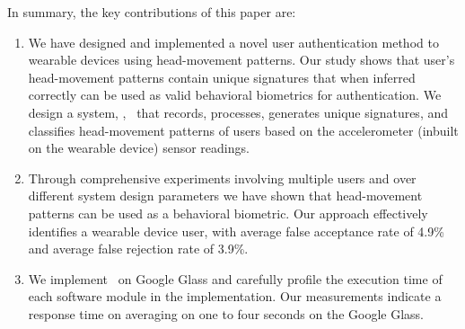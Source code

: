 
In summary, the key contributions of this paper are:

\begin{enumerate}

\item We have designed and implemented a novel user authentication method to wearable devices
using head-movement patterns. Our study shows that user's head-movement patterns
contain unique signatures that when inferred correctly can be used as valid
behavioral biometrics for authentication. We design a system, \systemname,~ 
that records, processes, generates unique signatures, and classifies 
head-movement patterns of users based on the accelerometer (inbuilt on the 
wearable device) sensor readings.


\item %
Through comprehensive experiments 
involving multiple users and over
different system design parameters we have shown that head-movement patterns
can be used as a behavioral biometric. 
Our approach effectively identifies a wearable device user, with average false 
acceptance rate of 4.9\% and average false rejection rate of 3.9\%.

\item We implement \systemname~on Google Glass and carefully profile the 
execution time of each software module in the implementation. Our measurements 
indicate a response time on averaging on one to four seconds on the Google Glass.

\end{enumerate}

